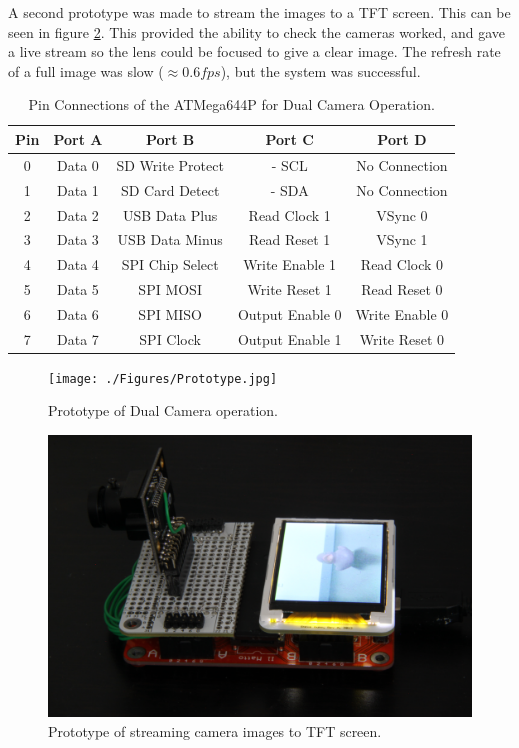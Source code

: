 A second prototype was made to stream the images to a TFT screen. This can be seen in figure \ref{fig:Prototype:TFT}. This provided the ability to check the cameras worked, and gave a live stream so the lens could be focused to give a clear image. The refresh rate of a full image was slow ($\approx 0.6fps$), but the system was successful.

\begin{table}
\centering
\begin{tabular}{ccccc}\toprule
Pin	& 	Port A 	& 	Port B 			& 	Port C 				& 	Port D 		\\ \toprule
0	&	Data 0	&	SD Write Protect&	\itc - SCL			&	No Connection	\\ \midrule
1	&	Data 1	&	SD Card Detect	&	\itc - SDA			&	No Connection	\\ \midrule
2	&	Data 2	&	USB Data Plus	&	Read Clock 1		&	VSync 0			\\ \midrule
3	&	Data 3	&	USB Data Minus	&	Read Reset 1		&	VSync 1			\\ \midrule
4	&	Data 4	&	SPI Chip Select	&	Write Enable 1		&	Read Clock 0	\\ \midrule
5	&	Data 5	&	SPI	MOSI 		&	Write Reset 1		&	Read Reset 0	\\ \midrule
6	&	Data 6	&	SPI MISO		&	Output Enable 0		&	Write Enable 0	\\ \midrule
7	&	Data 7	&	SPI Clock		&	Output Enable 1		&	Write Reset 0	\\ \bottomrule
\end{tabular}
\caption{Pin Connections of the ATMega644P for Dual Camera Operation.}
\label{table:644Pin}
\end{table}

\begin{figure}
\texttt{[image: ./Figures/Prototype.jpg]}
\caption{Prototype of Dual Camera operation.}
\label{fig:Prototype}
\end{figure}

\begin{figure}
\includegraphics[width=\textwidth]{./Figures/Camera_TFT.jpg}
\caption{Prototype of streaming camera images to TFT screen.}
\label{fig:Prototype:TFT}
\end{figure}

